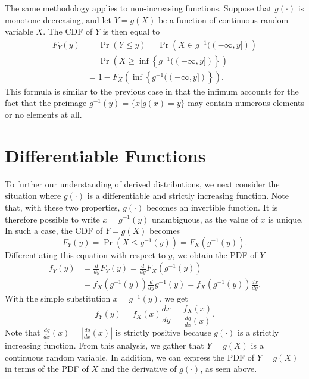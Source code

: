 The same methodology applies to non-increasing functions.
Suppose that $g(\cdot)$ is monotone decreasing, and let $Y = g(X)$ be a function of continuous random variable $X$.
The CDF of $Y$ is then equal to
\begin{equation} \label{equation:MonotoneDecreasingCDF}
\begin{split}
F_Y(y) &= \Pr (Y \leq y) = \Pr \left( X \in g^{-1} ((-\infty, y]) \right) \\
&= \Pr \left( X \geq \inf \left\{ g^{-1} ((-\infty, y]) \right\} \right) \\
&= 1 - F_X \left( \inf \left\{ g^{-1} ((-\infty, y] ) \right\} \right) .
\end{split}
\end{equation}
This formula is similar to the previous case in that the infimum accounts for the fact that the preimage $g^{-1}(y) = \{ x | g(x) = y \}$ may contain numerous elements or no elements at all.


\section{Differentiable Functions}

To further our understanding of derived distributions, we next consider the situation where $g(\cdot)$ is a differentiable and strictly increasing function.
Note that, with these two properties, $g(\cdot)$ becomes an invertible function.
It is therefore possible to write $x = g^{-1} (y)$ unambiguous, as the value of $x$ is unique.
In such a case, the CDF of $Y = g(X)$ becomes
\begin{equation*}
F_Y(y) = \Pr \left( X \leq g^{-1}(y) \right)
= F_X \left( g^{-1} (y) \right) .
\end{equation*}
Differentiating this equation with respect to $y$, we obtain the PDF of $Y$
\begin{equation*}
\begin{split}
f_Y (y) &= \frac{d}{dy} F_Y(y)
= \frac{d}{dy} F_X \left( g^{-1} (y) \right) \\
&= f_X \left( g^{-1} (y) \right) \frac{d}{dy} g^{-1} (y)
= f_X \left( g^{-1} (y) \right) \frac{dx}{dy} .
\end{split}
\end{equation*}
With the simple substitution $x = g^{-1} (y)$, we get
\begin{equation*}
f_Y (y) = f_X (x) \frac{dx}{dy}
= \frac{f_X (x)}{\frac{dg}{dx}(x)} .
\end{equation*}
Note that $\frac{dg}{dx} (x) = \left| \frac{dg}{dx} (x) \right|$ is strictly positive because $g(\cdot)$ is a strictly increasing function.
From this analysis, we gather that $Y=g(X)$ is a continuous random variable.
In addition, we can express the PDF of $Y = g(X)$ in terms of the PDF of $X$ and the derivative of $g(\cdot)$, as seen above.

